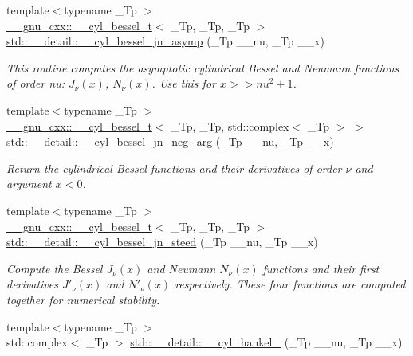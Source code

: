 \begin{DoxyCompactItemize}
{\footnotesize template$<$typename \+\_\+\+Tp $>$ }\\\hyperlink{struct____gnu__cxx_1_1____cyl__bessel__t}{\+\_\+\+\_\+gnu\+\_\+cxx\+::\+\_\+\+\_\+cyl\+\_\+bessel\+\_\+t}$<$ \+\_\+\+Tp, \+\_\+\+Tp, \+\_\+\+Tp $>$ \hyperlink{namespacestd_1_1____detail_aeab3c6b4c96d8885871d2973b77e537f}{std\+::\+\_\+\+\_\+detail\+::\+\_\+\+\_\+cyl\+\_\+bessel\+\_\+jn\+\_\+asymp} (\+\_\+\+Tp \+\_\+\+\_\+nu, \+\_\+\+Tp \+\_\+\+\_\+x)
\begin{DoxyCompactList}\small\item\em This routine computes the asymptotic cylindrical Bessel and Neumann functions of order nu\+: $ J_{\nu}(x) $, $ N_{\nu}(x) $. Use this for $ x >> nu^2 + 1 $. \end{DoxyCompactList}\item 
{\footnotesize template$<$typename \+\_\+\+Tp $>$ }\\\hyperlink{struct____gnu__cxx_1_1____cyl__bessel__t}{\+\_\+\+\_\+gnu\+\_\+cxx\+::\+\_\+\+\_\+cyl\+\_\+bessel\+\_\+t}$<$ \+\_\+\+Tp, \+\_\+\+Tp, std\+::complex$<$ \+\_\+\+Tp $>$ $>$ \hyperlink{namespacestd_1_1____detail_a82d890270a5a8697d4af64c390b4b0e4}{std\+::\+\_\+\+\_\+detail\+::\+\_\+\+\_\+cyl\+\_\+bessel\+\_\+jn\+\_\+neg\+\_\+arg} (\+\_\+\+Tp \+\_\+\+\_\+nu, \+\_\+\+Tp \+\_\+\+\_\+x)
\begin{DoxyCompactList}\small\item\em Return the cylindrical Bessel functions and their derivatives of order $ \nu $ and argument $ x < 0 $. \end{DoxyCompactList}\item 
{\footnotesize template$<$typename \+\_\+\+Tp $>$ }\\\hyperlink{struct____gnu__cxx_1_1____cyl__bessel__t}{\+\_\+\+\_\+gnu\+\_\+cxx\+::\+\_\+\+\_\+cyl\+\_\+bessel\+\_\+t}$<$ \+\_\+\+Tp, \+\_\+\+Tp, \+\_\+\+Tp $>$ \hyperlink{namespacestd_1_1____detail_a92e231f659735cf87c67a35f5ac4dd36}{std\+::\+\_\+\+\_\+detail\+::\+\_\+\+\_\+cyl\+\_\+bessel\+\_\+jn\+\_\+steed} (\+\_\+\+Tp \+\_\+\+\_\+nu, \+\_\+\+Tp \+\_\+\+\_\+x)
\begin{DoxyCompactList}\small\item\em Compute the Bessel $ J_\nu(x) $ and Neumann $ N_\nu(x) $ functions and their first derivatives $ J'_\nu(x) $ and $ N'_\nu(x) $ respectively. These four functions are computed together for numerical stability. \end{DoxyCompactList}\item 
{\footnotesize template$<$typename \+\_\+\+Tp $>$ }\\std\+::complex$<$ \+\_\+\+Tp $>$ \hyperlink{namespacestd_1_1____detail_aac3fc60c1210e8f2ae3cf05cdc7bad84}{std\+::\+\_\+\+\_\+detail\+::\+\_\+\+\_\+cyl\+\_\+hankel\+\_} (\+\_\+\+Tp \+\_\+\+\_\+nu, \+\_\+\+Tp \+\_\+\+\_\+x)

\end{DoxyCompactItemize}
